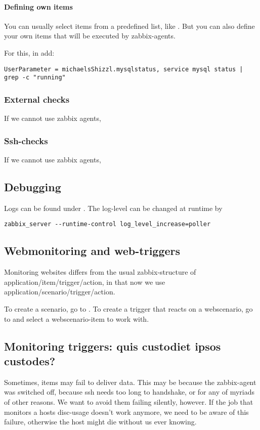 \paragraph{Defining own items}
You can usually select items from a predefined list, like .
But you can also define your own items that will be executed by zabbix-agents.

For this, in  add: 

\begin{lstlisting}
UserParameter = michaelsShizzl.mysqlstatus, service mysql status | grep -c "running"
\end{lstlisting}


\subsubsection{External checks}
If we cannot use zabbix agents, 

\subsubsection{Ssh-checks}
If we cannot use zabbix agents, 



\subsection{Debugging}
Logs can be found under . The log-level can be changed at runtime by 
\begin{lstlisting}
zabbix_server --runtime-control log_level_increase=poller
\end{lstlisting}



\subsection{Webmonitoring and web-triggers}
Monitoring websites differs from the usual zabbix-structure of application/item/trigger/action, in that now we use application/scenario/trigger/action.

To create a scenario, go to . To create a trigger that reacts on a webscenario, go to  and select a webscenario-item to work with.



\subsection{Monitoring triggers: quis custodiet ipsos custodes?}
Sometimes, items may fail to deliver data. This may be because the zabbix-agent was switched off, because ssh needs too long to handshake, or for any of myriads of other reasons. We want to avoid them failing silently, however. If the job that monitors a hosts disc-usage doesn't work anymore, we need to be aware of this failure, otherwise the host might die without us ever knowing. 


